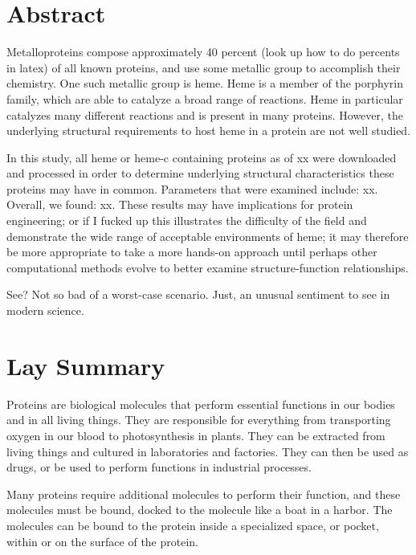 \documentclass[12pt,oneside,a4paper,twocolumn]{report}
\begin{document}
	
	
	\chapter*{Abstract}
	
	
		Metalloproteins compose approximately 40 percent (look up how to do percents in latex) of all known proteins, and use some metallic group to accomplish their chemistry. One such metallic group is heme. Heme is a member of the porphyrin family, which are able to catalyze a broad range of reactions. Heme in particular catalyzes many different reactions and is present in many proteins. However, the underlying structural requirements to host heme in a protein are not well studied.
		
		In this study, all heme or heme-c containing proteins as of xx were downloaded and processed in order to determine underlying structural characteristics these proteins may have in common. Parameters that were examined include: xx. Overall, we found: xx. These results may have implications for protein engineering; or if I fucked up this illustrates the difficulty of the field and demonstrate the wide range of acceptable environments of heme; it may therefore be more appropriate to take a more hands-on approach until perhaps other computational methods evolve to better examine structure-function relationships.
		
		See? Not so bad of a worst-case scenario. Just, an unusual sentiment to see in modern science.
		
	
	\chapter*{Lay Summary}
		
		Proteins are biological molecules that perform essential functions in our bodies and in all living things. They are responsible for everything from transporting oxygen in our blood to photosynthesis in plants. They can be extracted from living things and cultured in laboratories and factories. They can then be used as drugs, or be used to perform functions in industrial processes.
		
		Many proteins require additional molecules to perform their function, and these molecules must be bound, docked to the molecule like a boat in a harbor. The molecules can be bound to the protein inside a specialized space, or pocket, within or on the surface of the protein.
		
\end{document}

